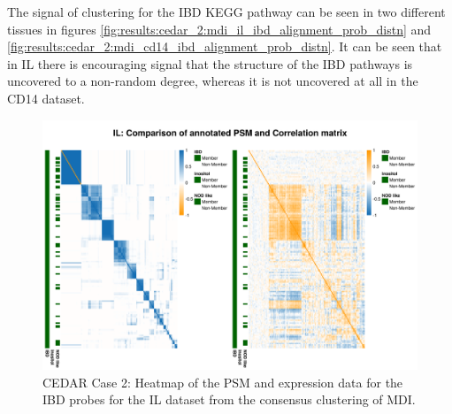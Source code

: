 \documentclass[12pt]{article} %
\begin{document}

	The signal of clustering for the IBD KEGG pathway can be seen in two different tissues in figures \ref{fig:results:cedar_2:mdi_il_ibd_alignment_prob_distn} and \ref{fig:results:cedar_2:mdi_cd14_ibd_alignment_prob_distn}. It can be seen that in IL there is encouraging signal that the structure of the IBD pathways is uncovered to a non-random degree, whereas it is not uncovered at all in the CD14 dataset.
%	
	
	\begin{figure}
		\centering
		\includegraphics[scale=0.75]{Images/Biology_data/Set_1000/All_datasets/Heatmaps/KEGG_INFLAMMATORY_BOWEL_DISEASE/IL_comp_psm_corr.png}
		\caption{CEDAR Case 2: Heatmap of the PSM and expression data for the IBD probes for the IL dataset from the consensus clustering of MDI.}
		\label{fig:results:cedar_2:mdi_il_ibd_psm_cor}
	\end{figure}
	
\end{document}
